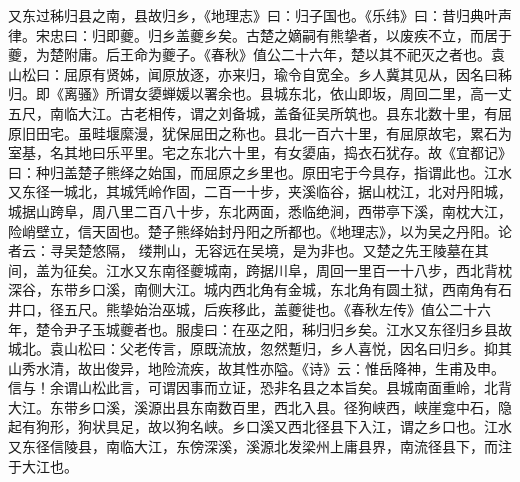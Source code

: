 \documentclass[12pt,UTF8]{ctexbook}
\begin{document}
又东过秭归县之南，县故归乡，《地理志》曰：归子国也。《乐纬》曰：昔归典叶声律。宋忠曰：归即夔。归乡盖夔乡矣。古楚之嫡嗣有熊挚者，以废疾不立，而居于夔，为楚附庸。后王命为夔子。《春秋》值公二十六年，楚以其不祀灭之者也。袁山松曰：屈原有贤姊，闻原放逐，亦来归，瑜令自宽全。乡人冀其见从，因名曰秭归。即《离骚》所谓女嬃蝉媛以署余也。县城东北，依山即坂，周回二里，高一丈五尺，南临大江。古老相传，谓之刘备城，盖备征吴所筑也。县东北数十里，有屈原旧田宅。虽畦堰縻漫，犹保屈田之称也。县北一百六十里，有屈原故宅，累石为室基，名其地曰乐平里。宅之东北六十里，有女嬃庙，捣衣石犹存。故《宜都记》曰：种归盖楚子熊绎之始国，而屈原之乡里也。原田宅于今具存，指谓此也。江水又东径一城北，其城凭岭作固，二百一十步，夹溪临谷，据山枕江，北对丹阳城，城据山跨阜，周八里二百八十步，东北两面，悉临绝涧，西带亭下溪，南枕大江，险峭壁立，信天固也。楚子熊绎始封丹阳之所都也。《地理志》，以为吴之丹阳。论者云：寻吴楚悠隔， 缕荆山，无容远在吴境，是为非也。又楚之先王陵墓在其间，盖为征矣。江水又东南径夔城南，跨据川阜，周回一里百一十八步，西北背枕深谷，东带乡口溪，南侧大江。城内西北角有金城，东北角有圆土狱，西南角有石井口，径五尺。熊挚始治巫城，后疾移此，盖夔徙也。《春秋左传》值公二十六年，楚令尹子玉城夔者也。服虔曰：在巫之阳，秭归归乡矣。江水又东径归乡县故城北。袁山松曰：父老传言，原既流放，忽然蹔归，乡人喜悦，因名曰归乡。抑其山秀水清，故出俊异，地险流疾，故其性亦隘。《诗》云：惟岳降神，生甫及申。信与！余谓山松此言，可谓因事而立证，恐非名县之本旨矣。县城南面重岭，北背大江。东带乡口溪，溪源出县东南数百里，西北入县。径狗峡西，峡崖龛中石，隐起有狗形，狗状具足，故以狗名峡。乡口溪又西北径县下入江，谓之乡口也。江水又东径信陵县，南临大江，东傍深溪，溪源北发梁州上庸县界，南流径县下，而注于大江也。
\end{document}
